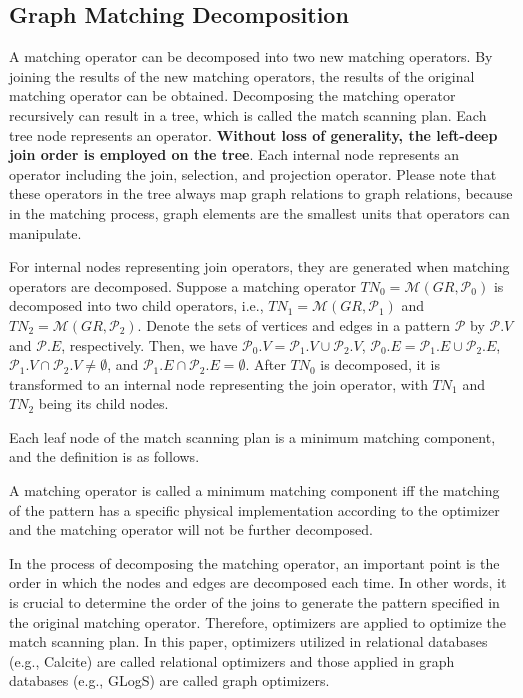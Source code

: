 \subsection{Graph Matching Decomposition}

A matching operator can be decomposed into two new matching operators.
By joining the results of the new matching operators, the results of the original matching operator can be obtained.
Decomposing the matching operator recursively can result in a tree, which is called the match scanning plan.
Each tree node represents an operator.
\textbf{Without loss of generality, the left-deep join order is employed on the tree}.
Each internal node represents an operator including the join, selection, and projection operator.
Please note that these operators in the tree always map graph relations to graph relations, because in the matching process, graph elements are the smallest units that operators can manipulate.

For internal nodes representing join operators, they are generated when matching operators are decomposed.
Suppose a matching operator $TN_0 = \mathcal{M}(GR, \mathcal{P}_0)$ is decomposed into two child operators, i.e., $TN_1 = \mathcal{M}(GR, \mathcal{P}_1)$ and $TN_2 = \mathcal{M}(GR, \mathcal{P}_2)$.
Denote the sets of vertices and edges in a pattern $\mathcal{P}$ by $\mathcal{P}.V$ and $\mathcal{P}.E$, respectively.
Then, we have $\mathcal{P}_0.V = \mathcal{P}_1.V \cup \mathcal{P}_2.V$, $\mathcal{P}_0.E = \mathcal{P}_1.E \cup \mathcal{P}_2.E$, $\mathcal{P}_1.V \cap \mathcal{P}_2.V \neq \emptyset$, and $\mathcal{P}_1.E \cap \mathcal{P}_2.E = \emptyset$.
After $TN_0$ is decomposed, it is transformed to an internal node representing the join operator, with $TN_1$ and $TN_2$ being its child nodes.


Each leaf node of the match scanning plan is a minimum matching component, and the definition is as follows.

\begin{definition}
    A matching operator is called a minimum matching component iff the matching of the pattern has a specific physical implementation according to the optimizer and the matching operator will not be further decomposed.
\end{definition}

In the process of decomposing the matching operator, an important point is the order in which the nodes and edges are decomposed each time.
In other words, it is crucial to determine the order of the joins to generate the pattern specified in the original matching operator.
Therefore, optimizers are applied to optimize the match scanning plan.
In this paper, optimizers utilized in relational databases (e.g., Calcite) are called relational optimizers and those applied in graph databases (e.g., GLogS) are called graph optimizers.

